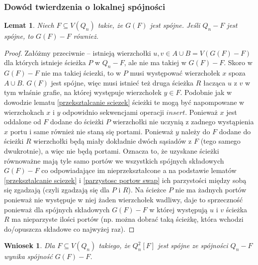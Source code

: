 \documentclass{pracamgr}
\newtheorem{lemma}[theorem]{Lemat}
\newtheorem{corollary}[theorem]{Wniosek}
\begin{document}
    \subsubsection{Dowód twierdzenia o lokalnej spójności}
     \begin{lemma}\label{Q_n-F spojne => G(F)-F spojne (1 skladowa)}
      Niech $F\subseteq V(Q_n)$ takie, że $G(F)$ jest spójne. Jeśli $Q_n-F$ jest spójne, to $G(F)-F$ również.
     \end{lemma}
     \begin{proof}
      Załóżmy przeciwnie -- istnieją wierzchołki $u,v\in A\cup B=V(G(F)-F)$ dla których istnieje ścieżka $P$ w $Q_n-F$, ale nie ma takiej w  $G(F)-F$.
      Skoro w $G(F)-F$ nie ma takiej ściezki, to w $P$ musi występować wierzchołek $x$ spoza $A\cup B$.\newline
      $G(F)$ jest spójne, więc musi istnieć też druga ścieżka $R$ łacząca $u$ z $v$ w tym właśnie grafie, na której występuje wierzchołek $y\in F$.\newline
      Podobnie jak w dowodzie lematu \ref{przeksztalcanie sciezek} 
      ścieżki te mogą być napompowane w wierzchokach $x$ i $y$ odpowidnio sekwencjami operacji $insert$.\newline
      Ponieważ $x$ jest oddalone od $F$ dodane do ścieżki $P$ wierzchołki nie uczynią z zadnego wystąpienia $x$ portu i same również nie staną się portami.
      Ponieważ $y$ należy do $F$ dodane do ścieżki $R$ wierzchołki będą miały dokładnie dwóch sąsiadów z $F$ (tego samego dwukrotnie), a więc nie będą portami.\newline
      Oznacza to, że uzyskane ścieżki równoważne mają tyle samo portów we wszystkich spójnych składowych $G(F)-F$ co odpowiadające im nieprzekształcone
      a na podstawie lematów \ref{przeksztalcanie sciezek} i \ref{parzystosc portow swap} ich parzystości między sobą się zgadzają (czyli zgadzają się dla $P$ i $R$).
      Na ścieżce $P$ nie ma żadnych portów ponieważ nie występuje w niej żaden wierzchołek wadliwy,
      daje to sprzeczność ponieważ dla spójnych składowych $G(F)-F$ w której występują
      $u$ i $v$ ścieżka $R$ ma nieparzyste ilości portów (np. można dobrać taką ścieżkę, która wchodzi do/opuszcza składowe co najwyżej raz).
     \end{proof}
     \begin{corollary}\label{Q_n-F spojne => Q_n^2[F]-F spojne (1 skladowa)}
      Dla $F\subseteq V(Q_n)$ takiego, że $Q_n^2[F]$ jest spójne ze spójności $Q_n-F$ wynika spójność $G(F)-F$.
     \end{corollary}
\end{document}
